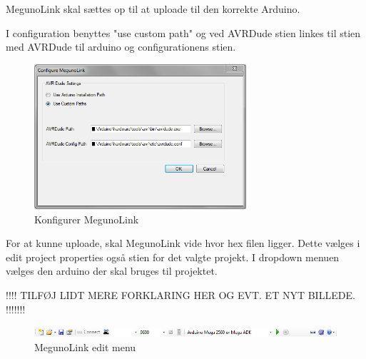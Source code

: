 MegunoLink skal sættes op til at uploade til den korrekte Arduino. 

I configuration benyttes "use custom path" og ved AVRDude stien linkes til stien med AVRDude til arduino og configurationens stien. 

\begin{figure}[H]
	\centering
	\includegraphics[width=0.7\textwidth]{Billeder/implementation/Howtoguide/megunolink_config.png}
	\caption{Konfigurer MegunoLink}
	\label{fig:Konfigurer_MegunoLink}
\end{figure}

For at kunne uploade, skal MegunoLink vide hvor hex filen ligger. Dette vælges i edit project properties også stien for det valgte projekt.
I dropdown menuen vælges den arduino der skal bruges til projektet.

!!!! TILFØJ LIDT MERE FORKLARING HER OG EVT. ET NYT BILLEDE. !!!!!!!

\begin{figure}[H]
	\centering
	\includegraphics[width=1\textwidth]{Billeder/implementation/Howtoguide/meguno_bar.png}
	\caption{MegunoLink edit menu}
	\label{fig:MegunoLink}
\end{figure}







